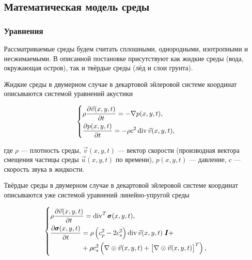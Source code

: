 \subsection{Математическая модель среды}

\subsubsection{Уравнения}

Рассматриваемые среды будем считать сплошными, однородными, изотропными и несжимаемыми. В описанной постановке присутствуют как жидкие среды (вода, окружающая остров), так и твёрдые среды (лёд и слои грунта).

Жидкие среды в двумерном случае в декартовой эйлеровой системе координат описываются системой уравнений акустики \cite{favorskaya_thesis}

\begin{equation}
    \begin{dcases}
        \rho \frac{\partial \vec{v}(x,y,t)}{\partial t} = -\nabla p (x,y,t) ,\\
        \frac{\partial p(x,y,t)}{\partial t} = -\rho c^2 \operatorname{div} \vec{v}(x,y,t) ,
    \end{dcases}
    \label{eq:acoustic_wave_eq}
\end{equation}

\noindent где $\rho$ --- плотность среды, $\vec{v}(x,y,t)$ --- вектор скорости (производная вектора смещения частицы среды $\vec{u}(x,y,t)$ по времени), $p(x,y,t)$ --- давление, $c$ --- скорость звука в жидкости.

Твёрдые среды в двумерном случае в декартовой эйлеровой системе координат описываются уже системой уравнений линейно-упругой среды \cite{favorskaya_thesis}

\begin{equation}
    \begin{dcases}
        \rho \frac{\partial \vec{v}(x,y,t)}{\partial t} = \operatorname{div}^T \pmb{\sigma} (x,y,t) , \\
        \!\begin{aligned}
            \frac{\partial \pmb{\sigma}(x,y,t)}{\partial t} & = \rho \left(c_p^2 - 2c_s^2\right) \operatorname{div} \vec{v}(x,y,t) \ \pmb{I} +\\
            & +\rho c_s^2 \left(\nabla \otimes \vec{v}(x,y,t) + \left[ \nabla \otimes \vec{v}(x,y,t)\right]^T \right),
        \end{aligned} 
    \end{dcases}
    \label{eq:elastic_wave_eq}
\end{equation}

